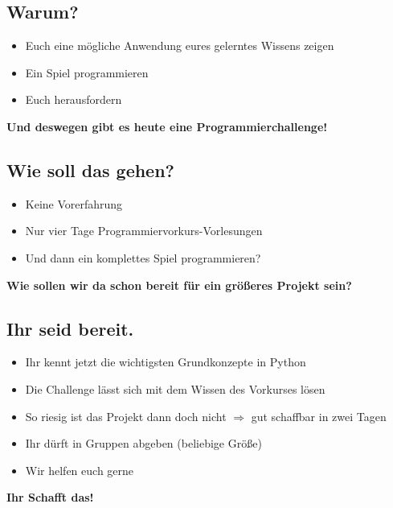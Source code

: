 \subsection{Warum?}
\begin{frame}
	\slidehead
	\begin{itemize}
		\item Euch eine mögliche Anwendung eures gelerntes Wissens zeigen
		\item Ein Spiel programmieren
		\item Euch herausfordern
	\end{itemize}
	\vspace{\fill}
	\begin{center}
		\textbf{\huge Und deswegen gibt es heute eine Programmierchallenge!}
	\end{center}
	\vspace{\fill}
\end{frame}

\subsection{Wie soll das gehen?}
\begin{frame}
	\slidehead
	\begin{itemize}
		\item Keine Vorerfahrung
		\item Nur vier Tage Programmiervorkurs-Vorlesungen
		\item Und dann ein komplettes Spiel programmieren?
	\end{itemize}
	\pause
	\vspace{\fill}
	\begin{center}
		\textbf{\huge Wie sollen wir da schon bereit für ein größeres Projekt sein?}
	\end{center}
	\vspace{\fill}
\end{frame}

\subsection{Ihr seid bereit.}
\begin{frame}
	\slidehead
	\begin{itemize}
		\item Ihr kennt jetzt die wichtigsten Grundkonzepte in Python
		\item Die Challenge lässt sich mit dem Wissen des Vorkurses lösen
		\item So riesig ist das Projekt dann doch nicht $\Rightarrow$ gut schaffbar in zwei Tagen
		\item Ihr dürft in Gruppen abgeben (beliebige Größe)
		\item Wir helfen euch gerne
	\end{itemize}
	\pause
	\vspace{\fill}
	\begin{center}
		\textbf{\huge Ihr Schafft das!}
	\end{center}
	\vspace{\fill}
\end{frame}

